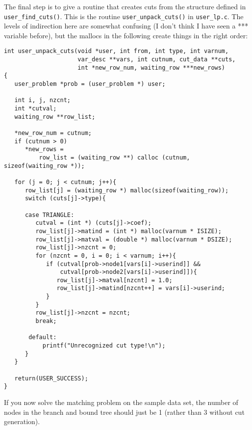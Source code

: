 \documentclass[11pt]{article}
\begin{document}
The final step is to give a routine that creates cuts from the structure
defined in \texttt{user\_find\_cuts()}. This is the routine
\texttt{user\_unpack\_cuts()} in \texttt{user\_lp.c}. The levels of
indirection here are somewhat confusing (I don't think I have seen a ***
variable before), but the mallocs in the following create things in the right
order:
\begin{verbatim}
int user_unpack_cuts(void *user, int from, int type, int varnum,
                     var_desc **vars, int cutnum, cut_data **cuts,
                     int *new_row_num, waiting_row ***new_rows)
{
   user_problem *prob = (user_problem *) user;
   
   int i, j, nzcnt;
   int *cutval;
   waiting_row **row_list;
   
   *new_row_num = cutnum;
   if (cutnum > 0)
      *new_rows =
          row_list = (waiting_row **) calloc (cutnum, sizeof(waiting_row *));
   
   for (j = 0; j < cutnum; j++){
      row_list[j] = (waiting_row *) malloc(sizeof(waiting_row));
      switch (cuts[j]->type){
	 
      case TRIANGLE:
         cutval = (int *) (cuts[j]->coef);
         row_list[j]->matind = (int *) malloc(varnum * ISIZE);
         row_list[j]->matval = (double *) malloc(varnum * DSIZE);
         row_list[j]->nzcnt = 0;
         for (nzcnt = 0, i = 0; i < varnum; i++){
            if (cutval[prob->node1[vars[i]->userind]] &&
                cutval[prob->node2[vars[i]->userind]]){
               row_list[j]->matval[nzcnt] = 1.0;
               row_list[j]->matind[nzcnt++] = vars[i]->userind;
            }
         }
         row_list[j]->nzcnt = nzcnt;
         break;

       default:
           printf("Unrecognized cut type!\n");
      }
   }
   
   return(USER_SUCCESS);
}
\end{verbatim}

If you now solve the matching problem on the sample data set, the number of
nodes in the branch and bound tree should just be 1 (rather than 3 without cut
generation).
\end{document}
